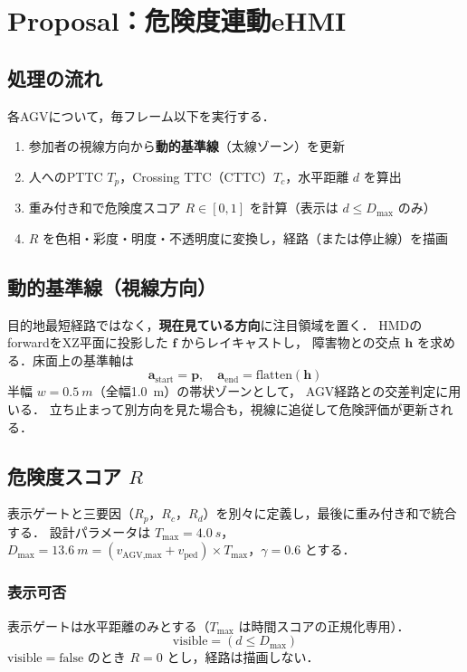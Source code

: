 \section{Proposal：危険度連動eHMI}
\label{sec:proposal}

\subsection{処理の流れ}

各AGVについて，毎フレーム以下を実行する．

\begin{enumerate}[leftmargin=2em]
  \item 参加者の視線方向から\textbf{動的基準線}（太線ゾーン）を更新
  \item 人へのPTTC $T_p$，Crossing TTC（CTTC）$T_c$，水平距離 $d$ を算出
  \item 重み付き和で危険度スコア $R \in [0,1]$ を計算（表示は $d\le D_\text{max}$ のみ）
  \item $R$ を色相・彩度・明度・不透明度に変換し，経路（または停止線）を描画
\end{enumerate}

\subsection{動的基準線（視線方向）}

目的地最短経路ではなく，\textbf{現在見ている方向}に注目領域を置く．
HMDのforwardをXZ平面に投影した $\mathbf{f}$ からレイキャストし，
障害物との交点 $\mathbf{h}$ を求める．床面上の基準軸は
\begin{equation}
  \mathbf{a}_\text{start} = \mathbf{p}, \quad
  \mathbf{a}_\text{end} = \mathrm{flatten}(\mathbf{h})
\end{equation}
半幅 $w=\SI{0.5}{m}$（全幅\SI{1.0}{m}）の帯状ゾーンとして，
AGV経路との交差判定に用いる．
立ち止まって別方向を見た場合も，視線に追従して危険評価が更新される．

\subsection{危険度スコア $R$}

表示ゲートと三要因（$R_p$，$R_c$，$R_d$）を別々に定義し，最後に重み付き和で統合する．
設計パラメータは $T_\text{max}=\SI{4.0}{s}$，$D_\text{max}=\SI{13.6}{m}=(v_\text{AGV,max}+v_\text{ped})\times T_\text{max}$，$\gamma=0.6$ とする．

\subsubsection{表示可否}
表示ゲートは水平距離のみとする（$T_\text{max}$ は時間スコアの正規化専用）．
\begin{equation}
  \text{visible} = (d \le D_\text{max})
\end{equation}
$\text{visible}=\mathrm{false}$ のとき $R=0$ とし，経路は描画しない．

